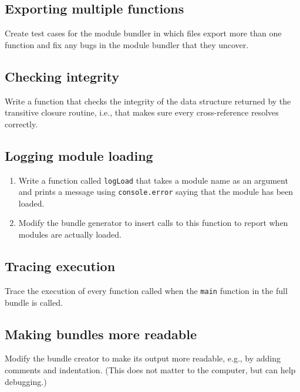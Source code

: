 \documentclass[krantzl]{krantz}
\begin{document}
\subsection*{Exporting multiple functions}


Create test cases for the module bundler in which files export more than one function
and fix any bugs in the module bundler that they uncover.

\subsection*{Checking integrity}


Write a function that checks the integrity of the data structure returned by the transitive closure routine,
i.e.,
that makes sure every cross-reference resolves correctly.

\subsection*{Logging module loading}

\begin{enumerate}

\item 

Write a function called \texttt{logLoad} that takes a module name as an argument
    and prints a message using \texttt{console.error} saying that the module has been loaded.



\item 

Modify the bundle generator to insert calls to this function
    to report when modules are actually loaded.



\end{enumerate}

\subsection*{Tracing execution}


Trace the execution of every function called
when the \texttt{main} function in the full bundle is called.

\subsection*{Making bundles more readable}


Modify the bundle creator to make its output more readable,
e.g.,
by adding comments and indentation.
(This does not matter to the computer,
but can help debugging.)
\end{document}
